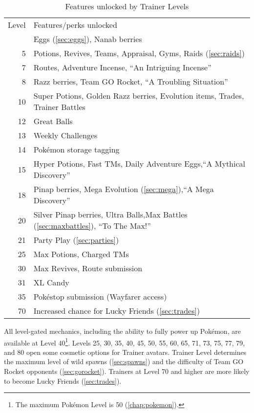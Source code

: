 \begin{table}
\centering
\begin{tabular}{rp{}}
Level & Features/perks unlocked \\
\Midrule
2 & Eggs (\autoref{sec:eggs}), Nanab berries \\
5 & Potions, Revives, Teams, Appraisal, Gyms, Raids (\autoref{sec:raids})\\
7 & Routes, Adventure Incense, ``An Intriguing Incense''\\
8 & Razz berries, Team GO Rocket, ``A Troubling Situation'' \\
10 & Super Potions, Golden Razz berries, Evolution items, Trades, Trainer Battles\\
12 & Great Balls\\
13 & Weekly Challenges\\
14 & Pokémon storage tagging\\
15 & Hyper Potions, Fast TMs, Daily Adventure Eggs,\newline``A Mythical Discovery'' \\
18 & Pinap berries, Mega Evolution (\autoref{sec:mega}),\newline``A Mega Discovery''\\
20 & Silver Pinap berries, Ultra Balls,\newline{}Max Battles (\autoref{sec:maxbattles}), ``To The Max!''\\
21 & Party Play (\autoref{sec:parties})\\
25 & Max Potions, Charged TMs\\
30 & Max Revives, Route submission\\
31 & XL Candy\\
35 & Pokéstop submission (Wayfarer access)\\
70 & Increased chance for Lucky Friends (\autoref{sec:trades})
\end{tabular}
\caption{Features unlocked by Trainer Levels\label{table:levelgates}}
\end{table}


All level-gated mechanics, including the ability to fully power up Pokémon,
 are available at Level 40\footnote{The maximum Pokémon Level is 50 (\autoref{chap:pokemon}).}.
Levels 25, 30, 35, 40, 45, 50, 55, 60, 65, 71, 73, 75, 77, 79, and 80 open some cosmetic options for Trainer avatars.
Trainer Level determines the maximum level of wild spawns
 (\autoref{sec:spawns}) and the difficulty of Team GO Rocket opponents
 (\autoref{sec:gorocket}).
Trainers at Level 70 and higher are more likely to become Lucky Friends (\autoref{sec:trades}).

